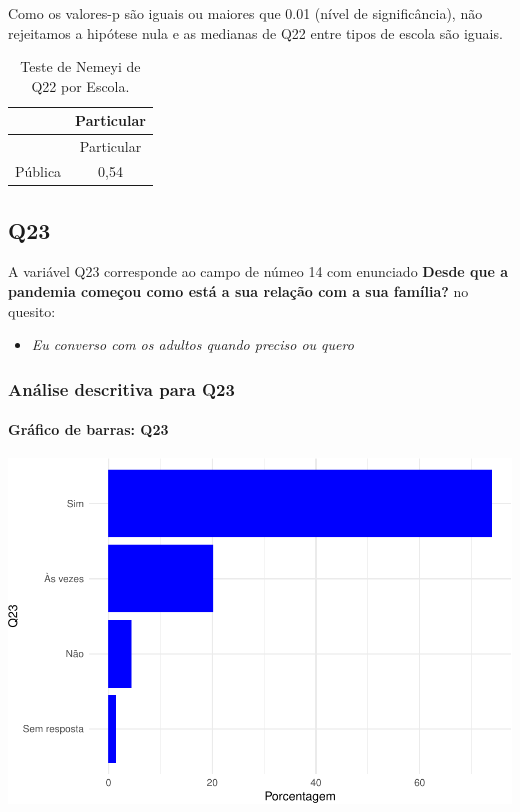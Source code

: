 \documentclass[]{article}
\providecommand{\tightlist}{%
  \setlength{\itemsep}{0pt}\setlength{\parskip}{0pt}}
\let\oldparagraph\paragraph
\renewcommand{\paragraph}[1]{\oldparagraph{#1}\mbox{}}
\begin{document}
Como os valores-p são iguais ou maiores que 0.01 (nível de significância), não rejeitamos a hipótese nula e as medianas de Q22 entre tipos de escola são iguais.

\begin{longtable}[]{@{}lc@{}}
\caption{\label{tab:unnamed-chunk-534}Teste de Nemeyi de Q22 por Escola.}\tabularnewline
\toprule
& Particular\tabularnewline
\midrule
\endfirsthead
\toprule
& Particular\tabularnewline
\midrule
\endhead
Pública & 0,54\tabularnewline
\bottomrule
\end{longtable}

\cleardoublepage

\hypertarget{q23}{%
\subsection{Q23}\label{q23}}

A variável Q23 corresponde ao campo de númeo 14 com enunciado \textbf{Desde que a pandemia começou como está a sua relação com a sua família?} no quesito:

\begin{itemize}
\tightlist
\item
  \emph{Eu converso com os adultos quando preciso ou quero}
\end{itemize}

\hypertarget{anuxe1lise-descritiva-para-q23}{%
\subsubsection{Análise descritiva para Q23}\label{anuxe1lise-descritiva-para-q23}}

\hypertarget{gruxe1fico-de-barras-q23}{%
\paragraph{Gráfico de barras: Q23}\label{gruxe1fico-de-barras-q23}}

\begin{center}\includegraphics[width=0.75\linewidth]{relatorio_covid19_files/figure-latex/unnamed-chunk-541-1} \end{center}
\end{document}
